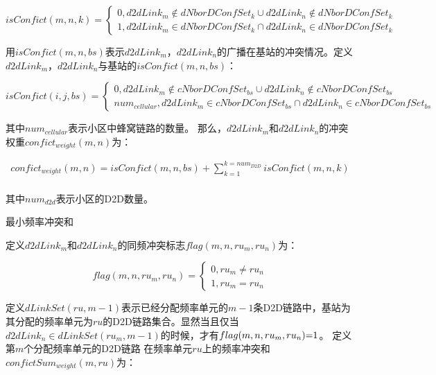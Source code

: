 \documentclass[figurelist,tablelist,algorithmlist,nomlist,masters]{seuthesix}
\begin{document}
\begin{enumerate}
		\begin{equation}\label{eq2.1}
		isConfict(m,n,k) = \left\{ \begin{array}{l}
		0,d2dLin{k_m} \notin dNborDConfSe{t_k} \cup d2dLin{k_n} \notin dNborDConfSe{t_k}\\
		1,d2dLin{k_m} \in dNborDConfSe{t_k} \cap d2dLin{k_n} \in dNborDConfSe{t_k}
		\end{array} \right.
		\end{equation}
		
		用$isConfict(m,n,bs)$表示$d2dLin{k_m}$，$d2dLin{k_n}$的广播在基站的冲突情况。定义$d2dLin{k_m}$，$d2dLin{k_n}$与基站的$isConfict(m,n,bs)$：
		
		\begin{equation}\label{eq2.1}
		isConfict(i,j,bs) = \left\{ \begin{array}{l} 0,d2dLin{k_m} \notin cNborDConfSe{t_{bs}} \cup d2dLin{k_n} \notin cNborDConfSe{t_{bs}}\\nu{m_{cellular}},d2dLin{k_m} \in cNborDConfSe{t_{bs}} \cap d2dLin{k_n} \in cNborDConfSe{t_{bs}} \end{array} \right.
		\end{equation}
		
		其中$nu{m_{cellular}}$表示小区中蜂窝链路的数量。
		那么，$d2dLin{k_m}$和$d2dLin{k_n}$的冲突权重$confic{t_{weight}}(m,n)$为：
		
		\begin{equation}\label{eq2.1}
		\begin{array}{l}
		confic{t_{weight}}(m,n) = isConfict(m,n,bs) + \sum\limits_{k = 1}^{k = nu{m_{D2D}}} {isConfict(m,n,k)} \\\end{array}
		\end{equation}
		
		
		其中$nu{m_{d2d}}$表示小区的D2D数量。
		
		最小频率冲突和
		
		定义$d2dLin{k_m}$和$d2dLin{k_n}$的同频冲突标志$flag(m,n,r{u_m},r{u_n})$为：
		
		\begin{equation}\label{eq2.1}
		flag(m,n,r{u_m},r{u_n}) = \left\{ \begin{array}{l} 0,r{u_m} \ne r{u_n}\\1,r{u_m} = r{u_n}\end{array} \right.
		\end{equation}
		
		定义$dLinkSet(ru,m - 1)$表示已经分配频率单元的$m-1$条D2D链路中，基站为其分配的频率单元为$ru$的D2D链路集合。显然当且仅当$d2dLin{k_n} \in dLinkSet(r{u_m},m - 1)$的时候，才有$flag(m,n,r{u_m},r{u_n}){\rm{ = }}1$。
		定义第$m$个分配频率单元的D2D链路 在频率单元$ru$上的频率冲突和$confictSu{m_{weight}}(m,ru)$为：
		

\end{enumerate}
\end{document}
